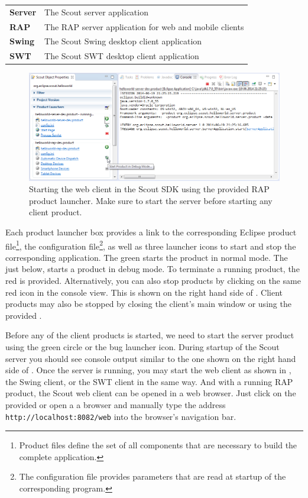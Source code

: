 \documentclass[a4paper,10pt,twoside]{book}
\begin{document}
\begin{tabular}{ l l }
  \textbf{Server} & The Scout server application\\
  \textbf{RAP}    & The RAP server application for web and mobile clients\\
  \textbf{Swing}  & The Scout Swing desktop client application\\
  \textbf{SWT}    & The Scout SWT desktop client application\\
\end{tabular}

\begin{figure}
\includegraphics[width=14cm]{sdk_start_client_product.png} 
\caption{Starting the web client in the Scout SDK using the provided RAP product launcher. Make sure to start the server before starting any client product.}
\end{figure}

Each product launcher box provides a link to the corresponding Eclipse product file\footnote{
Product files define the set of all components that are necessary to build the complete application.
},
the configuration file\footnote{
The configuration file  provides parameters that are read at startup of the corresponding program.
},
as well as three launcher icons to start and stop the corresponding application.
The green  starts the product in normal mode.
The  just below, starts a product in debug mode.
To terminate a running product, the red  is provided. 
Alternatively, you can also stop products by clicking on the same red icon in the console view.
This is shown on the right hand side of .
Client products may also be stopped by closing the client's main window or using the provided .

Before any of the client products is started, we need to start the server product using the green circle or the bug launcher icon.
During startup of the Scout server you should see console output similar to the one shown on the right hand side of .
Once the server is running, you may start the web client as shown in , the Swing client, or the SWT client in the same way.
And with a running RAP product, the Scout web client can be opened in a web browser.
Just click on the provided  or open a a browser and manually type the address \texttt{http://localhost:8082/web} into the browser's navigation bar.
\end{document}
